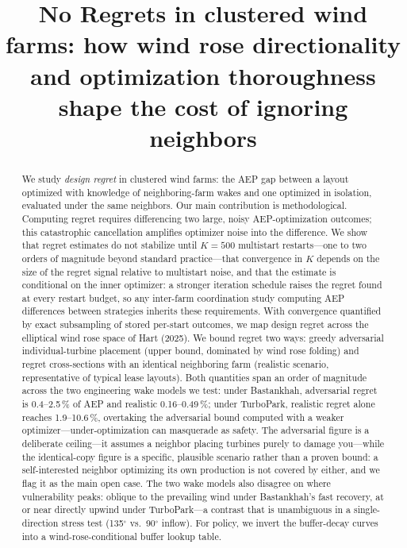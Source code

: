 \documentclass[wes, manuscript]{copernicus}
\title{No Regrets in clustered wind farms: how wind rose directionality and optimization thoroughness shape the cost of ignoring neighbors}
\affil[1]{Technical University of Denmark, Department of Wind and Energy Systems, Roskilde, Denmark}
\affil[2]{Technical University of Munich, Germany}
\affil[3]{TotalEnergies}
\begin{document}
\maketitle

\begin{abstract}
We study \emph{design regret} in clustered wind farms: the AEP gap between a layout optimized with knowledge of neighboring-farm wakes and one optimized in isolation, evaluated under the same neighbors.
Our main contribution is methodological.
Computing regret requires differencing two large, noisy AEP-optimization outcomes; this catastrophic cancellation amplifies optimizer noise into the difference.
We show that regret estimates do not stabilize until $K = 500$ multistart restarts---one to two orders of magnitude beyond standard practice---that convergence in $K$ depends on the size of the regret signal relative to multistart noise, and that the estimate is conditional on the inner optimizer: a stronger iteration schedule raises the regret found at every restart budget, so any inter-farm coordination study computing AEP differences between strategies inherits these requirements.
With convergence quantified by exact subsampling of stored per-start outcomes, we map design regret across the elliptical wind rose space of Hart (2025).
We bound regret two ways: greedy adversarial individual-turbine placement (upper bound, dominated by wind rose folding) and regret cross-sections with an identical neighboring farm (realistic scenario, representative of typical lease layouts).
Both quantities span an order of magnitude across the two engineering wake models we test: under Bastankhah, adversarial regret is 0.4--2.5\,\% of AEP and realistic 0.16--0.49\,\%; under TurboPark, realistic regret alone reaches 1.9--10.6\,\%, overtaking the adversarial bound computed with a weaker optimizer---under-optimization can masquerade as safety.
The adversarial figure is a deliberate ceiling---it assumes a neighbor placing turbines purely to damage you---while the identical-copy figure is a specific, plausible scenario rather than a proven bound: a self-interested neighbor optimizing its own production is not covered by either, and we flag it as the main open case.
The two wake models also disagree on where vulnerability peaks: oblique to the prevailing wind under Bastankhah's fast recovery, at or near directly upwind under TurboPark---a contrast that is unambiguous in a single-direction stress test (135$^\circ$ vs.\ 90$^\circ$ inflow).
For policy, we invert the buffer-decay curves into a wind-rose-conditional buffer lookup table.

\end{abstract}
\end{document}
